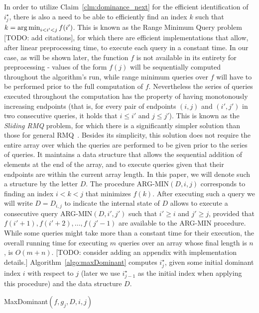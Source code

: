 In order to utilize Claim~\ref{clm:dominance_next} for the efficient identification of $i^\star_j$, there is also a need to be able to efficiently find an index $k$ such that $k = \operatorname*{arg\,min}_{i < i' < j} f(i')$. This is known as the Range Minimum Query problem [TODO: add citations], for which there are efficient implementations that allow, after linear preprocessing time, to execute each query in a constant time. In our case, as will be shown later, the function $f$ is not available in its entirety for preprocessing - values of the form $f(j)$ will be sequentially computed throughout the algorithm's run, while range minimum queries over $f$ will have to be performed prior to the full computation of $f$. Nevertheless the series of queries executed throughout the computation has the property of having monotonously increasing endpoints (that is, for every pair of endpoints $(i, j)$ and $(i', j')$ in two consecutive queries, it holds that $i \leq i'$ and $j \leq j'$). This is known as the \emph{Sliding RMQ} problem, for which there is a significantly simpler solution than those for general RMQ~\cite{lee2007simple}. Besides its simplicity, this solution does not require the entire array over which the queries are performed to be given prior to the series of queries. It maintains a data structure that allows the sequential addition of elements at the end of the array, and to execute queries given that their endpoints are within the current array length. In this paper, we will denote such a structure by the letter $D$. The procedure ARG-MIN$(D, i, j)$ corresponds to finding an index $i < k < j$ that minimizes $f(k)$. After executing such a query we will write $D = D_{i, j}$ to indicate the internal state of $D$ allows to execute a consecutive query ARG-MIN$(D, i', j')$ such that $i' \geq i$ and $j' \geq j$, provided that $f(i'+1), f(i'+2), \ldots, f(j'-1)$ are available to the ARG-MIN procedure.
While some queries might take more than a constant time for their execution, the overall running time for executing $m$ queries over an array whose final length is $n$, is $O(m+n)$. 
[TODO: consider adding an appendix with implementation details.] Algorithm~\ref{algo:maxDominant} computes $i^\star_j$, given some initial dominant index $i$ with respect to $j$ (later we use $i^\star_{j-1}$ as the initial index when applying this procedure) and the data structure $D$.

\begin{algorithm}
	\;
	\caption{MaxDominant$(f, g_j, D, i, j)$}
	\label{algo:maxDominant}
\end{algorithm}


